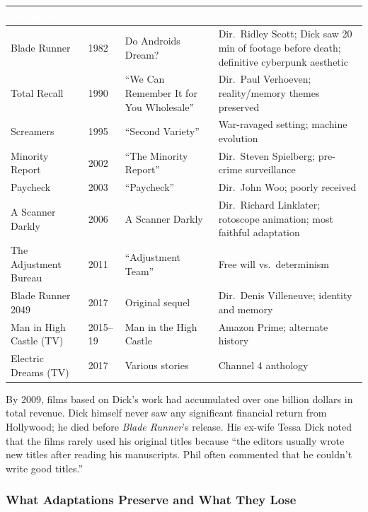 \documentclass[11pt,letterpaper]{article}
\newcommand{\tableheader}[1]{\textbf{\sffamily\textcolor{white}{#1}}}
\begin{document}
\begin{center}
\begin{tabularx}{\textwidth}{L{3.5cm}C{1cm}L{3cm}X}
\toprule
{}
\tableheader{Adaptation} & \tableheader{Year} & \tableheader{Source} & \tableheader{Notes} \\
\midrule
Blade Runner & 1982 & Do Androids Dream? & Dir.\ Ridley Scott; Dick saw 20 min of footage before death; definitive cyberpunk aesthetic \\
Total Recall & 1990 & ``We Can Remember It for You Wholesale'' & Dir.\ Paul Verhoeven; reality/memory themes preserved \\
Screamers & 1995 & ``Second Variety'' & War-ravaged setting; machine evolution \\
Minority Report & 2002 & ``The Minority Report'' & Dir.\ Steven Spielberg; pre-crime surveillance \\
Paycheck & 2003 & ``Paycheck'' & Dir.\ John Woo; poorly received \\
A Scanner Darkly & 2006 & A Scanner Darkly & Dir.\ Richard Linklater; rotoscope animation; most faithful adaptation \\
The Adjustment Bureau & 2011 & ``Adjustment Team'' & Free will vs.\ determinism \\
Blade Runner 2049 & 2017 & Original sequel & Dir.\ Denis Villeneuve; identity and memory \\
Man in High Castle (TV) & 2015--19 & Man in the High Castle & Amazon Prime; alternate history \\
Electric Dreams (TV) & 2017 & Various stories & Channel 4 anthology \\
\bottomrule
\end{tabularx}
\end{center}

By 2009, films based on Dick's work had accumulated over one billion dollars in total revenue. Dick himself never saw any significant financial return from Hollywood; he died before \textit{Blade Runner}'s release. His ex-wife Tessa Dick noted that the films rarely used his original titles because ``the editors usually wrote new titles after reading his manuscripts. Phil often commented that he couldn't write good titles.''

\subsubsection{What Adaptations Preserve and What They Lose}
\end{document}
